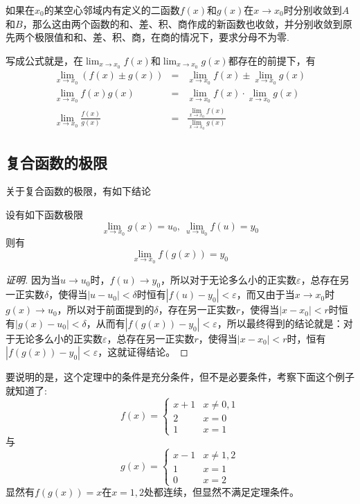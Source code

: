 \begin{theorem}[四则运算法则]
  如果在$x_0$的某空心邻域内有定义的二函数$f(x)$和$g(x)$在$x \to x_0$时分别收敛到$A$和$B$，那么这由两个函数的和、差、积、商作成的新函数也收敛，并分别收敛到原先两个极限值和和、差、积、商，在商的情况下，要求分母不为零.
\end{theorem}

写成公式就是，在$\lim_{x \to x_0} f(x)$和$\lim_{x \to x_0}g(x)$都存在的前提下，有
\begin{eqnarray*}
  \lim_{x \to x_0} (f(x) \pm g(x)) & = & \lim_{x \to x_0} f(x) \pm \lim_{x \to x_0} g(x)  \\
  \lim_{x \to x_0} f(x)g(x) & = & \lim_{x \to x_0} f(x) \cdot \lim_{x \to x_0} g(x)  \\
  \lim_{x \to x_0} \frac{f(x)}{g(x)} & = & \frac{\lim_{x \to x_0} f(x)}{\lim_{x \to x_0} g(x)}  
\end{eqnarray*}


\subsection{复合函数的极限}
\label{sec:limit-of-composite-function}

关于复合函数的极限，有如下结论
\begin{theorem}
  \label{theorem:limit-of-combine-function}
  设有如下函数极限
  \[ \lim_{x \to x_0}g(x) = u_0, \  \lim_{u \to u_0}f(u) = y_0 \]
  则有
  \[ \lim_{x \to x_0} f(g(x))=y_0 \]
\end{theorem}

\begin{proof}[证明]
  因为当$u \to u_0$时，$f(u) \to y_0$，所以对于无论多么小的正实数$\varepsilon$，总存在另一正实数$\delta$，使得当$|u-u_0|<\delta$时恒有$|f(u)-y_0|<\varepsilon$，而又由于当$x \to x_0$时$g(x) \to u_0$，所以对于前面提到的$\delta$，存在另一正实数$r$，使得当$|x-x_0|<r$时恒有$|g(x)-u_0|<\delta$，从而有$|f(g(x))-y_0|<\varepsilon$，所以最终得到的结论就是：对于无论多么小的正实数$\varepsilon$，总存在另一正实数$r$，使得当$|x-x_0|<r$时，恒有$|f(g(x))-y_0|<\varepsilon$，这就证得结论。
\end{proof}

要说明的是，这个定理中的条件是充分条件，但不是必要条件，考察下面这个例子就知道了:
\[ f(x) =
  \begin{cases}
    x+1 & x \neq 0,1 \\
    2 & x=0 \\
    1 & x=1
  \end{cases}
\]
与
\[ g(x) =
  \begin{cases}
    x-1 & x \neq 1,2 \\
    1 & x=1 \\
    0 & x= 2
  \end{cases}
\]
显然有$f(g(x))=x$在$x=1,2$处都连续，但显然不满足定理条件。

